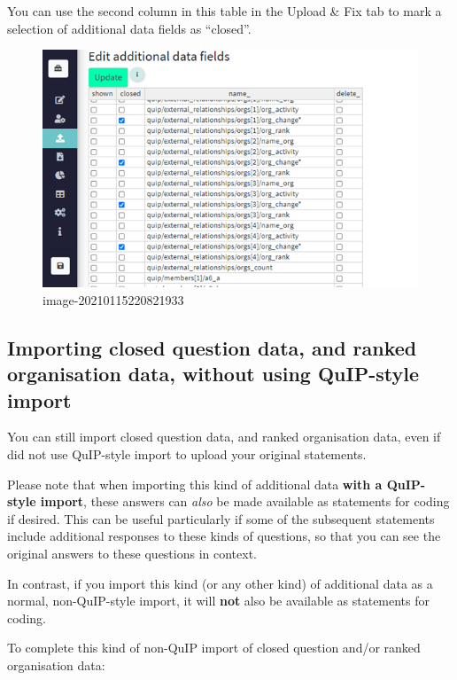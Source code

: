\documentclass[
]{book}
\begin{document}
You can use the second column in this table in the Upload \& Fix tab to mark a selection of additional data fields as ``closed''.

\begin{figure}
\centering
\includegraphics{_assets/image-20210115220821933.png}
\caption{image-20210115220821933}
\end{figure}

\hypertarget{importing-closed-question-data-and-ranked-organisation-data-without-using-quip-style-import}{%
\subsection{Importing closed question data, and ranked organisation data, without using QuIP-style import}\label{importing-closed-question-data-and-ranked-organisation-data-without-using-quip-style-import}}

You can still import closed question data, and ranked organisation data, even if did not use QuIP-style import to upload your original statements.

Please note that when importing this kind of additional data \textbf{with a QuIP-style import}, these answers can \emph{also} be made available as statements for coding if desired. This can be useful particularly if some of the subsequent statements include additional responses to these kinds of questions, so that you can see the original answers to these questions in context.

In contrast, if you import this kind (or any other kind) of additional data as a normal, non-QuIP-style import, it will \textbf{not} also be available as statements for coding.

To complete this kind of non-QuIP import of closed question and/or ranked organisation data:
\end{document}
